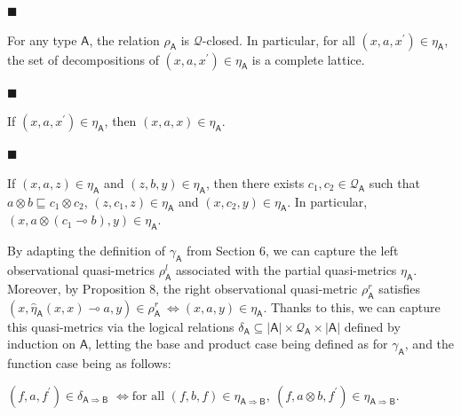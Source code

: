 \documentclass[10pt,a4paper]{amsart}
\begin{document}
\par\noindent  $\blacksquare$ 
 
For any type $\mathsf{A}$, the relation $\rho_{\mathsf{A}}$ is $\mathcal{Q}$-closed. In particular, for all $(x,a,x^{\prime})\in\eta_{\mathsf{A}}$, the set of decompositions of $(x,a,x^{\prime})\in\eta_{\mathsf{A}}$ is a complete lattice.\par
 
 
 
\par\noindent  $\blacksquare$ 
 
If $(x,a,x^{\prime})\in\eta_{\mathsf{A}}$, then $(x,a,x)\in\eta_{\mathsf{A}}$.\par
 
 
 
\par\noindent  $\blacksquare$ 
 
If $(x,a,z)\in\eta_{\mathsf{A}}$ and $(z,b,y)\in\eta_{\mathsf{A}}$, then there exists $c_{1},c_{2}\in\mathcal{Q}_{\mathsf{A}}$ such that $a\otimes b\sqsubseteq c_{1}\otimes c_{2}$, $(z,c_{1},z)\in\eta_{\mathsf{A}}$ and $(x,c_{2},y)\in\eta_{\mathsf{A}}$. In particular, $(x,a\otimes(c_{1}\multimap b),y)\in\eta_{\mathsf{A}}$.\par
 
 
  
 
 
 
By adapting the definition of $\gamma_{\mathsf{A}}$ from Section 6, we can capture the left observational quasi-metrics $\rho_{\mathsf{A}}^{l}$ associated with the partial quasi-metrics $\eta_{\mathsf{A}}$. Moreover, by Proposition 8, the right observational quasi-metric $\rho_{\mathsf{A}}^{r}$ satisfies $(x,\widehat{\eta}_{\mathsf{A}}(x,x)\multimap a,y)\in\rho_{\mathsf{A}}^{r}\ %
\iff(x,a,y)\in\eta_{\mathsf{A}}$. Thanks to this, we can capture this quasi-metrics via the logical relations $\delta_{\mathsf{A}}\subseteq|\mathsf{A}|\times\mathcal{Q}_{\mathsf{A}}\times|%
\mathsf{A}|$ defined by induction on $\mathsf{A}$, letting the base and product case being defined as for $\gamma_{\mathsf{A}}$, and the function case being as follows:\par
    $\displaystyle(f,a,f^{\prime})\in\delta_{\mathsf{A}\Rightarrow\mathsf{B}}$ $\displaystyle\iff\text{for all }(f,b,f)\in\eta_{\mathsf{A}\Rightarrow\mathsf{B%
}},\ (f,a\otimes b,f^{\prime})\in\eta_{\mathsf{A}\Rightarrow\mathsf{B}}.$    
\end{document}

